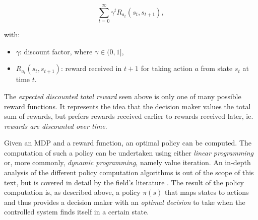 \[
\sum_{t=0}^{\infty} {\gamma}^{t}R_{a_t}(s_t,s_{t+1}),
\]

with:
\begin{itemize}
\item $\gamma$: discount factor, where $\gamma\in(0,1]$,
\item $R_{a_t}(s_t,s_{t+1})$: reward received in $t+1$ for taking action $a$ from state $s_t$ at time $t$.	
\end{itemize}

The \textit{expected discounted total reward} seen above is only one of many possible reward functions. It represents the idea that the decision maker values the total sum of rewards, but prefers rewards received earlier to rewards received later, ie. \textit{rewards are discounted over time}.

Given an MDP and a reward function, an optimal policy can be computed. The computation of such a policy can be undertaken using either \textit{linear programming} or, more commonly, \textit{dynamic programming}, namely value iteration. An in-depth analysis of the different policy computation algorithms is out of the scope of this text, but is covered in detail by the field's literature \cite{puterman}. The result of the policy computation is, as described above, a policy $\pi(s)$ that maps states to actions and thus provides a decision maker with an \textit{optimal decision} to take when the controlled system finds itself in a certain state.